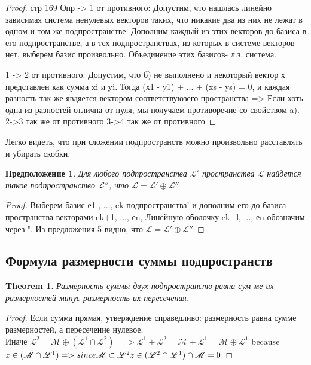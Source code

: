 \documentclass[11pt; a4paper]{report}
\theoremstyle{plain} %
\newtheorem{theorem}{Theorem}
\newtheorem{sug}{Предположение}[section]
\theoremstyle{defenition}
\theoremstyle{remark}
\begin{document}
\begin{proof} 
стр 169
Опр -> 1 от противного:
Допустим, что нашлась линейно зависимая система ненулевых век­торов таких, что никакие два из них не лежат в одном и том же подпространстве. Дополним каждый из этих векторов до базиса в его подпространстве, а в тех подпространствах, из которых в системе векторов нет, выберем базис произвольно. Объединение этих базисов- л.з. система.

 1 -> 2  от противного. 
 Допустим, что б) не выполнено и некоторый вектор х представлен как сумма xi и yi. 
 Тогда (х1 - y1) + ... + (xs - ys) = 0, и каждая разность так же явдяется вектором 
 соответствуюзего пространства => Если хоть одна из разностей от­лична от нуля, 
 мы получаем противоречие со свойством a).
 2->3 так же от противного
 3->4 так же от противного
\end{proof}

Легко видеть, что при сложении подпространств можно произ­вольно расставлять и убирать скобки.

\begin{sug}\label{sug6.2.6}
Для любого подпространства $\mathscr{L}'$ пространст­ва $\mathscr{L}$ найдется 
такое подпространство $\mathscr{L}''$, что $\mathscr{L}=\mathscr{L}' \oplus \mathscr{L}''$ 
\end{sug}
\begin{proof} 
 Выберем базис е1 , ..., ek подпространства' и дополним его до базиса пространства векторами ek+1, ..., еn,
  Ли­нейную оболочку ek+l, ..., еn обозначим через ". Из предложения 5 видно, что
  $\mathscr{L}=\mathscr{L}' \oplus \mathscr{L}''$ 
\end{proof}



\subsection{Формула размерности суммы подпространств}
\begin{theorem}\label{t2}
    Размерность суммы двух подпространств равна сум­ ме их размерностей минус размерность их пересечения.
\end{theorem}
\begin{proof} 
    Если сумма прямая, утверждение справедливо: размерность равна сумме размерностей, 
    а пересечение нулевое.\\
    Иначе $\mathscr{L}^2=\mathscr{M} \oplus (\mathscr{L}^1 \cap \mathscr{L}^2) => 
    \mathscr{L}^1+\mathscr{L}^2=\mathscr{M} + \mathscr{L}^1 = \mathscr{M} \oplus\mathscr{L}^1$
    because $z \in (\mathscr{M} \cap \mathscr{L}^1)=> since \mathscr{M} \subset \mathscr{L}^2\\
    z \in (\mathscr{L}^2 \cap \mathscr{L}^1) \cap \mathscr{M} = 0$
\end{proof}
\end{document}
